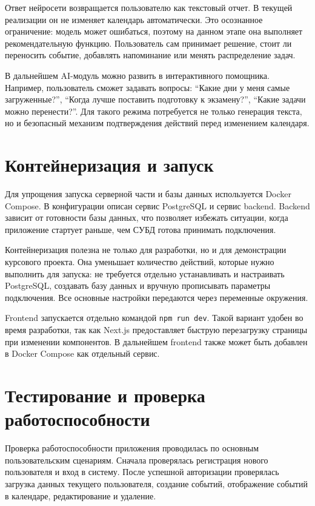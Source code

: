 \documentclass[14pt,a4paper]{extreport}
\begin{document}
Ответ нейросети возвращается пользователю как текстовый отчет. В текущей реализации он не изменяет календарь автоматически. Это осознанное ограничение: модель может ошибаться, поэтому на данном этапе она выполняет рекомендательную функцию. Пользователь сам принимает решение, стоит ли переносить событие, добавлять напоминание или менять распределение задач.

В дальнейшем AI-модуль можно развить в интерактивного помощника. Например, пользователь сможет задавать вопросы: ``Какие дни у меня самые загруженные?'', ``Когда лучше поставить подготовку к экзамену?'', ``Какие задачи можно перенести?''. Для такого режима потребуется не только генерация текста, но и безопасный механизм подтверждения действий перед изменением календаря.

\section{Контейнеризация и запуск}

Для упрощения запуска серверной части и базы данных используется Docker Compose. В конфигурации описан сервис PostgreSQL и сервис backend. Backend зависит от готовности базы данных, что позволяет избежать ситуации, когда приложение стартует раньше, чем СУБД готова принимать подключения.

Контейнеризация полезна не только для разработки, но и для демонстрации курсового проекта. Она уменьшает количество действий, которые нужно выполнить для запуска: не требуется отдельно устанавливать и настраивать PostgreSQL, создавать базу данных и вручную прописывать параметры подключения. Все основные настройки передаются через переменные окружения.

Frontend запускается отдельно командой \texttt{npm run dev}. Такой вариант удобен во время разработки, так как Next.js предоставляет быструю перезагрузку страницы при изменении компонентов. В дальнейшем frontend также может быть добавлен в Docker Compose как отдельный сервис.

\section{Тестирование и проверка работоспособности}

Проверка работоспособности приложения проводилась по основным пользовательским сценариям. Сначала проверялась регистрация нового пользователя и вход в систему. После успешной авторизации проверялась загрузка данных текущего пользователя, создание событий, отображение событий в календаре, редактирование и удаление.
\end{document}
